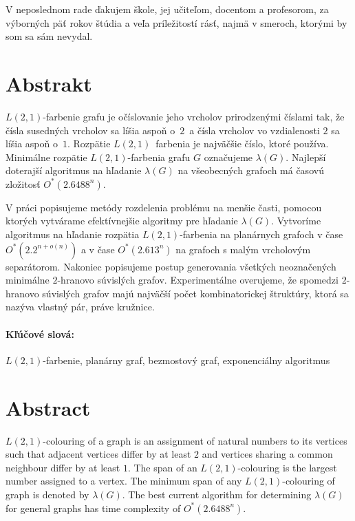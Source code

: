 \documentclass[12pt, oneside]{book}
\begin{document}
V neposlednom rade ďakujem škole, jej učiteľom, docentom a profesorom, za výborných päť
rokov štúdia a veľa príležitostí rásť, najmä v smeroch, ktorými by som sa sám nevydal.


\newpage 
\section*{Abstrakt}

$L(2,1)$-farbenie grafu je očíslovanie jeho vrcholov prirodzenými číslami tak,
že čísla susedných vrcholov sa líšia aspoň o $2$ a čísla vrcholov vo vzdialenosti
$2$ sa líšia aspoň o $1$. Rozpätie $L(2,1)$ farbenia je najväčšie číslo, ktoré
používa. Minimálne rozpätie $L(2,1)$-farbenia grafu $G$ označujeme $\lambda(G)$.
Najlepší doterajší algoritmus na hľadanie $\lambda(G)$ na všeobecných grafoch má
časovú zložitosť $O^*(2.6488^n)$.

V práci popisujeme metódy rozdelenia problému na menšie časti, pomocou
ktorých vytvárame efektívnejšie algoritmy pre hľadanie $\lambda(G)$.
Vytvoríme algoritmus na hľadanie rozpätia $L(2,1)$-farbenia na planárnych
grafoch v čase $O^*(2.2^{n + o(n)})$ a v čase $O^*(2.613^n)$ na grafoch s malým
vrcholovým separátorom. Nakoniec popisujeme postup generovania všetkých neoznačených
minimálne $2$-hranovo súvislých grafov. Experimentálne overujeme, že spomedzi $2$-hranovo
súvislých grafov majú najväčší počet kombinatorickej štruktúry, ktorá sa
nazýva vlastný pár, práve kružnice.

\paragraph*{Kľúčové slová:} $L(2,1)$-farbenie, planárny graf, bezmostový graf, exponenciálny algoritmus



\newpage 
\section*{Abstract}

$L(2,1)$-colouring of a graph is an assignment of natural numbers to its vertices such
that adjacent vertices differ by at least $2$ and vertices sharing a common neighbour
differ by at least $1$. The span of an $L(2,1)$-colouring is the largest number assigned
to a vertex. The minimum span of any $L(2,1)$-colouring of graph is denoted by $\lambda(G)$.
The best current algorithm for determining $\lambda(G)$ for general graphs has
time complexity of $O^*(2.6488^n)$.
\end{document}
